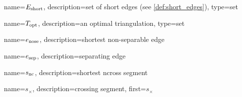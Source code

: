 {
  name={\ensuremath{E_\textnormal{short}}},
  description={set of short edges (see \cref{def:short_edges})},
  type={set}
}

{
  name={\ensuremath{T_\textnormal{opt}}},
  description={an optimal triangulation},
  type={set}
}

{
  name={\ensuremath{e_\textnormal{nose}}},
  description={shortest non-separable edge}
}

{
  name={\ensuremath{e_\textnormal{sep}}},
  description={separating edge}
}

{
  name={\ensuremath{s_\textnormal{nc}}},
  description={shortest \gls{ncross} segment}
}

{
  name={\ensuremath{s_{\times}}},
  description={crossing segment},
  first={\ensuremath{s_{\times}}}
}
